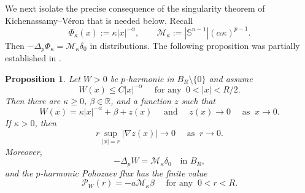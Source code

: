 \documentclass[reqno,12pt]{amsart}
\numberwithin{equation}{section}
\newtheorem{prop}[thm]{Proposition}
\theoremstyle{remark}
\newcommand{\R}{\mathbb R}
\newcommand{\Pscr}{\mathscr P}
\begin{document}
We next isolate the precise consequence of the singularity theorem of Kichenassamy--V\'eron that is needed below.  Recall
$$
\Phi_\kappa(x):=\kappa|x|^{-\alpha},
\qquad \mathcal M_\kappa
:=|\mathbb S^{n-1}|(\alpha\kappa)^{p-1}.
$$
Then $-\Delta_p\Phi_\kappa=\mathcal M_\kappa\delta_0$ in distributions. The following proposition was partially established in \cite[Section 3]{QZ2026}. 

\begin{prop} \label{prop:pole-expansion}
Let $W>0$ be $p$-harmonic in $B_R\setminus\{0\}$ and assume
$$
W(x)\le C|x|^{-\alpha} \quad \text{ for any } \ 0<|x|<R/2.
$$
Then there are $\kappa\ge0$, $\beta\in\R$, and a function $z$ such that
$$
W(x)=\kappa|x|^{-\alpha}+\beta+z(x) \quad \text{ and } \quad z(x)\to0
\quad \text{ as } \ x\to 0.
$$
If $\kappa>0$, then
\begin{equation}\label{eq:improved-pole-derivative}
r\sup_{|x|=r}|\nabla z(x)|\to 0
\quad \text{ as }\ r\to 0.
\end{equation}
Moreover,
\begin{equation}\label{eq:pole-distribution}
-\Delta_pW=\mathcal M_\kappa\delta_0
\quad\text{in }B_R,
\end{equation}
and the $p$-harmonic Pohozaev flux has the finite value
\begin{equation}\label{eq:pole-Pohozaev-value}
\Pscr_W(r)
=-a\mathcal M_\kappa\beta
\quad \text{ for any } \ 0<r<R.
\end{equation}
\end{prop}
\end{document}
